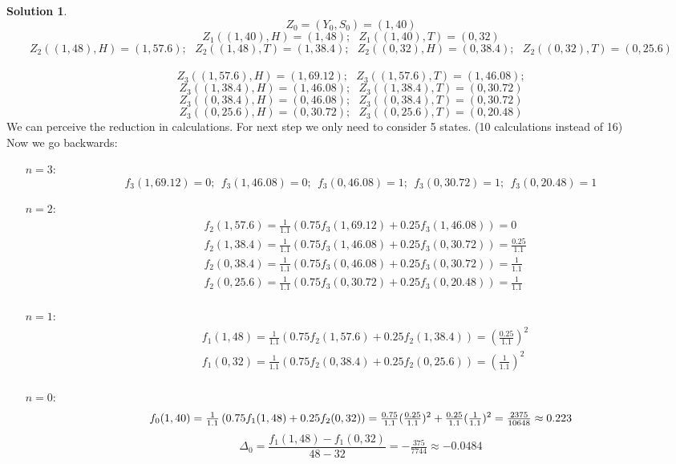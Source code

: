 \documentclass[a4paper, 10pt]{article}
\theoremstyle{definition}
\theoremstyle{hSol}
\newtheorem*{solution}{Solution}
\begin{document}
\begin{solution}
$$
Z_0 = (Y_0, S_0) = (1, 40)
$$
$$
Z_1((1, 40), H) = (1, 48);~~~Z_1((1, 40), T) = (0, 32)
$$
$$
Z_2((1, 48), H) = (1, 57.6);~~~Z_2((1, 48), T) = (1, 38.4);~~~Z_2((0, 32), H) = (0, 38.4);~~~Z_2((0, 32), T) = (0, 25.6)
$$
\\
$$
Z_3((1, 57.6), H) = (1, 69.12);~~~Z_3((1, 57.6), T) = (1, 46.08);
$$
$$
Z_3((1, 38.4), H) = (1, 46.08);~~~Z_3((1, 38.4), T) = (0, 30.72)
$$
$$
Z_3((0, 38.4), H) = (0, 46.08);~~~Z_3((0, 38.4), T) = (0, 30.72)
$$
$$
Z_3((0, 25.6), H) = (0, 30.72);~~~Z_3((0, 25.6), T) = (0, 20.48)
$$
We can perceive the reduction in calculations. For next step we only need to consider 5 states. (10 calculations instead of 16)\\
Now we go backwards:
\begin{itemize}
  \item[$n=3$:]
  $$
  f_3(1, 69.12) = 0;~~f_3(1, 46.08) = 0;~~f_3(0, 46.08) = 1;~~f_3(0, 30.72) = 1;~~f_3(0, 20.48) = 1
  $$
  \item[$n=2$:]
  \begin{equation}
  \begin{split}
    &f_2(1, 57.6) = \tfrac{1}{1.1}\left(0.75f_3(1, 69.12)+0.25f_3(1, 46.08)\right) = 0\\
    &f_2(1, 38.4) = \tfrac{1}{1.1}\left(0.75f_3(1, 46.08)+0.25f_3(0, 30.72)\right) = \tfrac{0.25}{1.1}\\
    &f_2(0, 38.4) = \tfrac{1}{1.1}\left(0.75f_3(0, 46.08)+0.25f_3(0, 30.72)\right) = \tfrac{1}{1.1}\\
    &f_2(0, 25.6) = \tfrac{1}{1.1}\left(0.75f_3(0, 30.72)+0.25f_3(0, 20.48)\right) = \tfrac{1}{1.1}\\
  \end{split}
  \end{equation}
  \item[$n=1$:]
  \begin{equation}
  \begin{split}
    &f_1(1, 48) = \tfrac{1}{1.1}\left(0.75f_2(1, 57.6)+0.25f_2(1, 38.4)\right) = (\tfrac{0.25}{1.1})^2\\
    &f_1(0, 32) = \tfrac{1}{1.1}\left(0.75f_2(0, 38.4)+0.25f_2(0, 25.6)\right) = (\tfrac{1}{1.1})^2\\
  \end{split}
\end{equation}
\item[$n=0$:]
\begin{equation}
  f_0(1, 40) = \tfrac{1}{1.1}\left(0.75f_1(1, 48)+0.25f_2(0, 32)\right) = \tfrac{0.75}{1.1}(\tfrac{0.25}{1.1})^2 + \tfrac{0.25}{1.1}(\tfrac{1}{1.1})^2  = \tfrac{2375}{10648}\approx 0.223\\
\end{equation}
\begin{equation}
  \Delta_0 = \frac{f_1(1,48)- f_1(0,32)}{48 - 32} = -\tfrac{375}{7744} \approx-0.0484
\end{equation}
\end{itemize}




\end{solution}
\end{document}
